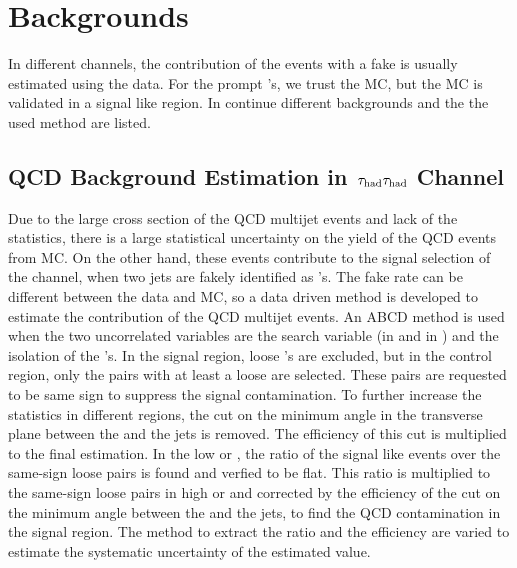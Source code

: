 \section{Backgrounds}
\label{sect:bkgLepTau}
In different channels, the contribution of the events with a fake \Tau is usually estimated using the data. For the prompt \Tau's, we trust 
the MC, but the MC is validated in a signal like region. In continue different backgrounds and the the used method are listed.

\subsection{\texorpdfstring{QCD Background Estimation in $\,\tau_{\rm had}\tau_{\rm had}$ Channel}{QCD Background Estimation in tau-tau Channel}}
Due to the large cross section of the QCD multijet events and lack of the statistics, there is a large statistical uncertainty on the 
yield of the QCD events from MC. On the other hand, these events contribute to the signal selection of the \tauTau channel, when two jets are 
fakely identified as \Tau's. The fake rate can be different between the data and MC, so a data driven method is developed to estimate the 
contribution of the QCD multijet events. 
An ABCD method is used when the two uncorrelated variables are the search variable (\mttwo in \binone and \SumMT in \bintwo) and the 
isolation of the \Tau's. In the signal region, loose \Tau's are excluded, but in the control region, only the pairs with at least a loose \Tau 
are selected. These pairs are requested to be same sign to suppress the signal contamination. To further increase the statistics 
in different regions, the cut on the minimum angle in the transverse plane between the \MET and the jets is removed. The efficiency of this
cut is multiplied to the final estimation. In the low \mttwo or \SumMT, the ratio of the signal like events over the same-sign loose pairs 
is found and verfied to be flat. 
This ratio is multiplied to the same-sign loose pairs in high \mttwo or \SumMT and corrected by the efficiency of the 
cut on the minimum angle between the \MET and the jets, to find the QCD contamination in the signal region. The method to extract the
ratio and the efficiency are varied to estimate the systematic uncertainty of the estimated value.



